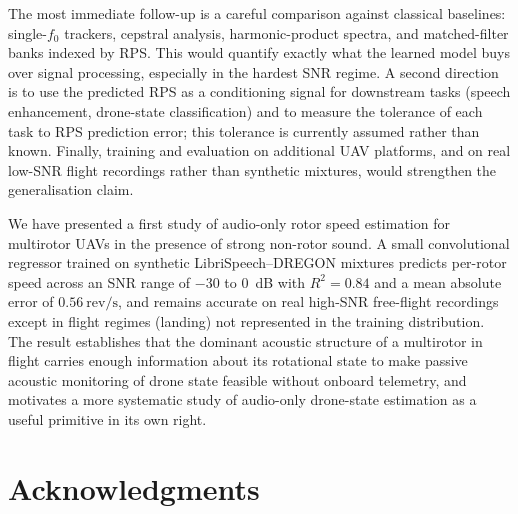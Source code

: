 \documentclass{QD_2026}
\newcommand{\revps}{\mathrm{rev}/\mathrm{s}}
\newcommand{\rsq}{R^{2}}
\begin{document}
The most immediate follow-up is a careful comparison against classical baselines:
single-$f_{0}$ trackers, cepstral analysis, harmonic-product spectra, and
matched-filter banks indexed by RPS.
This would quantify exactly what the learned model buys over signal processing,
especially in the hardest SNR regime.
A second direction is to use the predicted RPS as a conditioning signal for
downstream tasks (speech enhancement, drone-state classification) and to measure
the tolerance of each task to RPS prediction error; this tolerance is currently
assumed rather than known.
Finally, training and evaluation on additional UAV platforms, and on real
low-SNR flight recordings rather than synthetic mixtures, would strengthen the
generalisation claim.

We have presented a first study of audio-only rotor speed estimation for
multirotor UAVs in the presence of strong non-rotor sound.
A small convolutional regressor trained on synthetic LibriSpeech--DREGON mixtures
predicts per-rotor speed across an SNR range of $-30$ to $0$~dB with
$\rsq = 0.84$ and a mean absolute error of $0.56~\revps$, and remains accurate
on real high-SNR free-flight recordings except in flight regimes (landing) not
represented in the training distribution.
The result establishes that the dominant acoustic structure of a multirotor in
flight carries enough information about its rotational state to make passive
acoustic monitoring of drone state feasible without onboard telemetry, and
motivates a more systematic study of audio-only drone-state estimation as a
useful primitive in its own right.

\section*{Acknowledgments}



\end{document}
